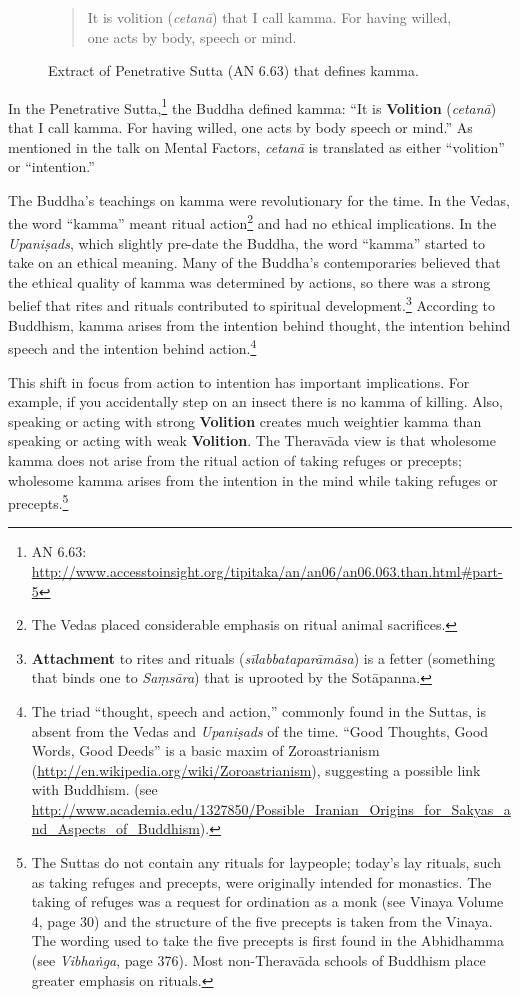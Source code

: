 \begin{figure}[H]
\begin{quotation}
It is volition (\textit{cetanā}) that I call kamma. For having willed, one acts by body, speech or mind.
\end{quotation}
\caption{Extract of Penetrative Sutta (AN 6.63) that defines kamma.}
\label{fig:AN6}
\end{figure}

In the Penetrative Sutta,\footnote{AN 6.63: \url{http://www.accesstoinsight.org/tipitaka/an/an06/an06.063.than.html\#part-5}} the Buddha defined kamma: “It is \textbf{Volition} (\textit{cetanā}) that I call kamma. For having willed, one acts by body speech or mind.” As mentioned in the talk on Mental Factors, \textit{cetanā} is translated as either “volition” or “intention.”

The Buddha’s teachings on kamma were revolutionary for the time. In the Vedas, the word “kamma” meant ritual action\footnote{The Vedas placed considerable emphasis on ritual animal sacrifices.} and had no ethical implications. In the \textit{Upaniṣads}, which slightly pre-date the Buddha, the word “kamma” started to take on an ethical meaning. Many of the Buddha’s contemporaries believed that the ethical quality of kamma was determined by actions, so there was a strong belief that rites and rituals contributed to spiritual development.\footnote{\textbf{Attachment} to rites and rituals (\textit{sīlabbataparāmāsa}) is a fetter (something that binds one to \textit{Saṃsāra}) that is uprooted by the Sotāpanna.} According to Buddhism, kamma arises from the intention behind thought, the intention behind speech and the intention behind action.\footnote{The triad “thought, speech and action,” commonly found in the Suttas, is absent from the Vedas and \textit{Upaniṣads} of the time. “Good Thoughts, Good Words, Good Deeds” is a basic maxim of Zoroastrianism (\url{http://en.wikipedia.org/wiki/Zoroastrianism}), suggesting a possible link with Buddhism. (see\\
\url{http://www.academia.edu/1327850/Possible_Iranian_Origins_for_Sakyas_and_Aspects_of_Buddhism}).}

This shift in focus from action to intention has important implications. For example, if you accidentally step on an insect there is no kamma of killing. Also, speaking or acting with strong \textbf{Volition} creates much weightier kamma than speaking or acting with weak \textbf{Volition}. The Theravāda view is that wholesome kamma does not arise from the ritual action of taking refuges or precepts; wholesome kamma arises from the intention in the mind while taking refuges or precepts.\footnote{The Suttas do not contain any rituals for laypeople; today’s lay rituals, such as taking refuges and precepts, were originally intended for monastics. The taking of refuges was a request for ordination as a monk (see Vinaya Volume 4, page 30) and the structure of the five precepts is taken from the Vinaya. The wording used to take the five precepts is first found in the Abhidhamma (see \textit{Vibhaṅga}, page 376). Most non-Theravāda schools of Buddhism place greater emphasis on rituals.}

